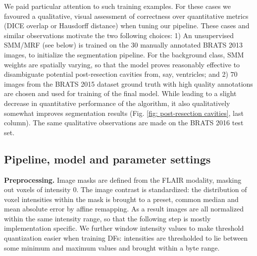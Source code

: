 We paid particular attention to such training examples. For these cases we favoured a qualitative, visual assessment of correctness over quantitative metrics (DICE overlap or Hausdorff distance) when tuning our pipeline. These cases and similar observations motivate the two following choices: 1) An unsupervised SMM/MRF (see below) is trained on the $30$ manually annotated BRATS 2013 images, to initialize the segmentation pipeline. For the background class, SMM weights are spatially varying, so that the model proves reasonably effective to disambiguate potential post-resection cavities from, say, ventricles; and 2) $70$ images from the BRATS 2015 dataset ground truth with high quality annotations are chosen and used for training of the final model. While leading to a slight decrease in quantitative performance of the algorithm, it also qualitatively somewhat improves segmentation results (Fig. \ref{fig: post-resection cavities}, last column). The same qualitative observations are made on the BRATS 2016 test set. 

\subsection{Pipeline, model and parameter settings}

\noindent
\textbf{Preprocessing.} Image masks are defined from the FLAIR modality, masking out voxels of intensity $0$. The image contrast is standardized: the distribution of voxel intensities within the mask is brought to a preset, common median and mean absolute error by affine remapping. As a result images are all normalized within the same intensity range, so that the following step is mostly implementation specific. We further window intensity values to make threshold quantization easier when training DFs: intensities are thresholded to lie between some minimum and maximum values and brought within a byte range.\\

